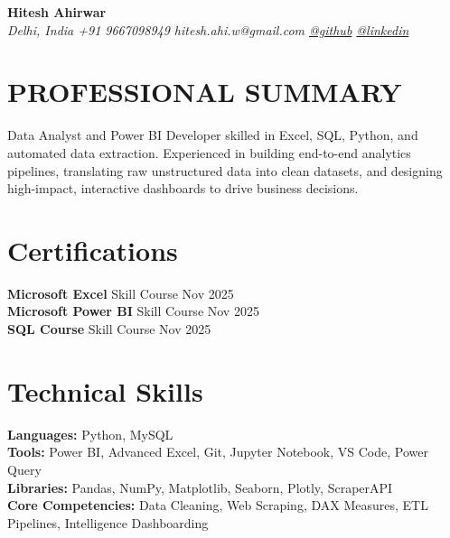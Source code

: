 \documentclass[11pt,letterpaper]{article}
\begin{document}
\pagestyle{empty}

\noindent
{\LARGE\bfseries Hitesh Ahirwar} \\[5pt]
\textit {Delhi, India \textbar{} +91 9667098949 \textbar{} hitesh.ahi.w@gmail.com \textbar{} \href{https://github.com/hiteahi}{@github} \textbar{} \href{https://www.linkedin.com/in/hiteahi}{@linkedin}}

\section{PROFESSIONAL SUMMARY}
 Data Analyst and Power BI Developer skilled in Excel, SQL, Python, and automated data extraction. Experienced in building end-to-end analytics pipelines, translating raw unstructured data into clean datasets, and designing high-impact, interactive dashboards to drive business decisions.

\section{Certifications}
\noindent
\textbf{Microsoft Excel} \textbar{} Skill Course \hfill Nov 2025 \\
\textbf{Microsoft Power BI} \textbar{} Skill Course \hfill Nov 2025 \\
\textbf{SQL Course} \textbar{} Skill Course \hfill Nov 2025

\section{Technical Skills}
\noindent
\textbf{Languages:} Python, MySQL\\
\textbf{Tools:} Power BI, Advanced Excel, Git, Jupyter Notebook, VS Code, Power Query \\
\textbf{Libraries:} Pandas, NumPy, Matplotlib, Seaborn, Plotly, ScraperAPI \\
\textbf{Core Competencies:} Data Cleaning, Web Scraping, DAX Measures, ETL Pipelines, Intelligence Dashboarding 
\end{document}
